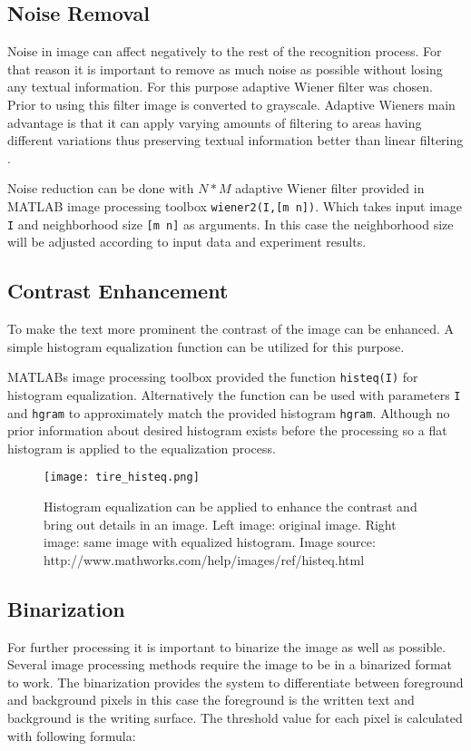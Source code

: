 \documentclass{article}
\def\code#1{\texttt{#1}}
\begin{document}
        \subsection{Noise Removal}
          Noise in image can affect negatively to the rest of the recognition process. For that reason it is important to remove as much noise as possible without losing any textual information. For this purpose adaptive Wiener filter was chosen. Prior to using this filter image is converted to grayscale. Adaptive Wieners main advantage is that it can apply varying amounts of filtering to areas having different variations thus preserving textual information better than linear filtering \cite{TheMathWorksWiener}.

          Noise reduction can be done with $N * M$ adaptive Wiener filter provided in MATLAB image processing toolbox \code{wiener2(I,[m n])}. Which takes input image \code{I} and neighborhood size \code{[m n]} as arguments. In this case the neighborhood size will be adjusted according to input data and experiment results.

        \subsection{Contrast Enhancement}
          To make the text more prominent the contrast of the image can be enhanced. A simple histogram equalization function can be utilized for this purpose.

          MATLABs image processing toolbox provided the function \code{histeq(I)} for histogram equalization. Alternatively the function can be used with parameters \code{I} and \code{hgram} to approximately match the provided histogram \code{hgram}. Although no prior information about desired histogram exists before the processing so a flat histogram is applied to the equalization process.

          \begin{figure}[!ht]
            \centering
            \texttt{[image: tire\_histeq.png]}
            \caption{Histogram equalization can be applied to enhance the contrast and bring out details in an image. Left image: original image. Right image: same image with equalized histogram. Image source: http://www.mathworks.com/help/images/ref/histeq.html \label{fig:histeq} }
          \end{figure}

        \subsection{Binarization}
          For further processing it is important to binarize the image as well as possible. Several image processing methods require the image to be in a binarized format to work. The binarization provides the system to differentiate between foreground and background pixels in this case the foreground is the written text and background is the writing surface. The threshold value for each pixel is calculated with following formula:
\end{document}

